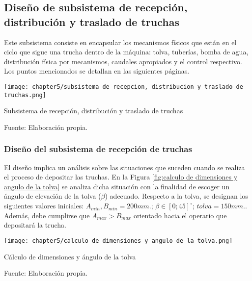 \subsection{Diseño de subsistema de recepción, distribución y traslado de truchas}
\label{ssec:diseno de subsistema de recepcion, distribucion y traslado de truchas}

Este subsistema consiste en encapsular los mecanismos físicos que están en el ciclo que sigue una trucha dentro de la máquina: tolva, tuberías, bomba de agua, distribución física por mecanismos, caudales apropiados y el control respectivo. Los puntos mencionados se detallan en las siguientes páginas.

\begin{myfigure}[H]
	\footnotesize\centering
	\texttt{[image: chapter5/subsistema de recepcion, distribucion y traslado de truchas.png]}
	\caption{Subsistema de recepción, distribución y traslado de truchas}
	\begin{myflushcenter}
		Fuente: Elaboración propia.
	\end{myflushcenter}
	\label{fig:subsistema de recepción, distribución y traslado de truchas}
\end{myfigure}

\subsubsection{Diseño del subsistema de recepción de truchas}

El diseño implica un análisis sobre las situaciones que suceden cuando se realiza el proceso de depositar las truchas. En la Figura \ref{fig:calculo de dimensiones y angulo de la tolva} se analiza dicha situación con la finalidad de escoger un ángulo de elevación de la tolva ($\beta$) adecuado. Respecto a la tolva, se designan los siguientes valores iniciales: $A_{min},B_{min}=200 mm.$; $\beta \in [0;45] ^\circ$; ${tolva}=150 mm.$. Además, debe cumplirse que $A_{max}>B_{max}$ orientado hacia el operario que depositará la trucha.

\begin{myfigure}[H]
	\footnotesize\centering
	\texttt{[image: chapter5/calculo de dimensiones y angulo de la tolva.png]}
	\caption{Cálculo de dimensiones y ángulo de la tolva}
	\begin{myflushcenter}
		Fuente: Elaboración propia.
	\end{myflushcenter}
	\label{fig:calculo de dimensiones y angulo de la tolva}
\end{myfigure}

